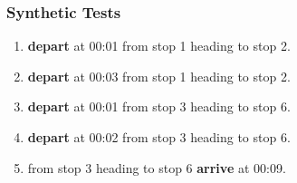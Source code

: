 \documentclass[a4paper,11pt]{article}
\begin{document}
\begin{enumerate}
\begin{enumerate}
\begin{figure}[h]
\begin{minipage}{275pt}
\end{minipage}
\label{fig:modalities_network}
\vspace{-0em}
\end{figure}

\subsubsection*{Synthetic Tests}
\begin{enumerate}
\item \textbf{depart} at 00:01 from stop 1 heading to stop 2.
\item \textbf{depart} at 00:03 from stop 1 heading to stop 2.
\item \textbf{depart} at 00:01 from stop 3 heading to stop 6.
\item \textbf{depart} at 00:02 from stop 3 heading to stop 6.
\item from stop 3 heading to stop 6 \textbf{arrive} at 00:09.
\end{enumerate}


\end{enumerate}
\end{enumerate}
\end{document}
